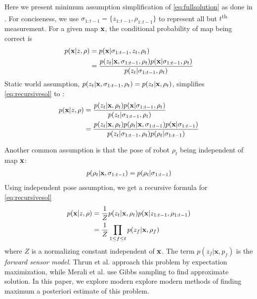\documentclass[letterpaper, 10 pt, conference]{ieeeconf} %
\newcommand{\vect}[1]{\mathbf{#1}}
\begin{document}
   Here we present minimum assumption simplification of
   \eqref{eq:fullsolution} as done in \cite{thrun2003learning,merali2013icra}. 
   For conciseness, we use 
   $\sigma_{1:t-1} = \{z_{1:t-1}, \rho_{1:t-1}\}$ to represent all but
   $t$\textsuperscript{th} measurement. For a given map $\map$, the conditional
   probability of map being correct is
   \begin{align}
     p(\map | z, \rho) &= p(\map | \sigma_{1:t-1}, z_t, \rho_t)\\
                    &= \frac{p(z_t|\map , \sigma_{1:t-1}, \rho_t)p(\map| \sigma_{1:t-1}, \rho_t)}
                            {p(z_t|\sigma_{1:t-1}, \rho_t)}
     \label{eq:recursivesol}
   \end{align}
   Static world assumption, $p(z_t|\map, \sigma_{1:t-1}, \rho_t) = p(z_t|\map, \rho_t)$, simplifies \eqref{eq:recursivesol} to :
   \begin{align}
     p(\map|z, \rho) &= \frac{p(z_t|\map, \rho_t)p(\map| \sigma_{1:t-1}, \rho_t)}
                          {p(z_t|\sigma_{1:t-1}, \rho_t)}\\
                  &= \frac{p(z_t|\map, \rho_t)p(\rho_t|\map, \sigma_{1:t-1})p(\map| \sigma_{1:t-1})}
                          {p(z_t|\sigma_{1:t-1}, \rho_t)p(\rho_t|\sigma_{1:t-1})}
   \end{align}

   Another common assumption is that the pose of robot $\rho_t$ being independent of map $\map$:
   \begin{align}
     p(\rho_t|\map, \sigma_{1:t-1}) = p(\rho_t|\sigma_{1:t-1})
   \end{align}
   Using independent pose assumption, we get a recursive formula for \eqref{eq:recursivesol}
   \begin{align}
     p(\map | z, \rho) &= \frac{1}{Z} p(z_t|\map , \rho_t)p(\map| z_{1:t-1}, \rho_{1:t-1})\\
                       &= \frac{1}{Z} \prod_{1 \le f \le t} p(z_f|\map, \rho_f)
     \label{eq:map}
   \end{align}
   where $Z$ is a normalizing constant independent of $\map$. The term $p(z_f|\vect{x}, p_f)$ is the \emph{forward sensor model}. Thrun et al. \cite{thrun2003learning} approach this problem by expectation maximization, while Merali et al. \cite{merali2013icra} use Gibbs sampling to find approximate solution. In this paper, we explore modern explore modern methods of finding maximum a posteriori estimate of this problem.
\end{document}
